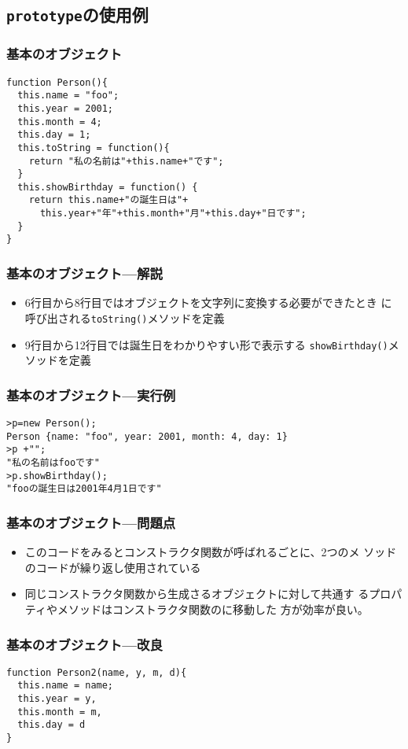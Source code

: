  \subsection{\protect\texttt{prototype}の使用例}
\begin{frame}[containsverbatim]
 \frametitle{基本のオブジェクト}
\begin{Verbatim}
function Person(){
  this.name = "foo";
  this.year = 2001;
  this.month = 4;
  this.day = 1;
  this.toString = function(){
    return "私の名前は"+this.name+"です";
  }
  this.showBirthday = function() {
    return this.name+"の誕生日は"+
      this.year+"年"+this.month+"月"+this.day+"日です";
  }
}
\end{Verbatim}
 \end{frame}
\begin{frame}[containsverbatim]
 \frametitle{基本のオブジェクト---解説}
 \begin{itemize}
  \item 6行目から8行目ではオブジェクトを文字列に変換する必要ができたとき
        に呼び出される\texttt{toString()}メソッドを定義
  \item 9行目から12行目では誕生日をわかりやすい形で表示する
        \texttt{showBirthday()}メソッドを定義
 \end{itemize}
 \end{frame}
\begin{frame}[containsverbatim]
 \frametitle{基本のオブジェクト---実行例}
\begin{Verbatim}
>p=new Person();
Person {name: "foo", year: 2001, month: 4, day: 1}
>p +"";
"私の名前はfooです"
>p.showBirthday();
"fooの誕生日は2001年4月1日です"
\end{Verbatim}
 \end{frame}
\begin{frame}[containsverbatim]
 \frametitle{基本のオブジェクト---問題点}
 \begin{itemize}
  \item このコードをみるとコンストラクタ関数が呼ばれるごとに、2つのメ
 ソッドのコードが繰り返し使用されている
  \item 同じコンストラクタ関数から生成さるオブジェクトに対して共通す
 るプロパティやメソッドはコンストラクタ関数のに移動した
 方が効率が良い。
 \end{itemize}
 \end{frame}
\begin{frame}[containsverbatim]
 \frametitle{基本のオブジェクト---改良}
\begin{Verbatim}
function Person2(name, y, m, d){
  this.name = name;
  this.year = y,
  this.month = m,
  this.day = d
}
\end{Verbatim}
 \end{frame}
